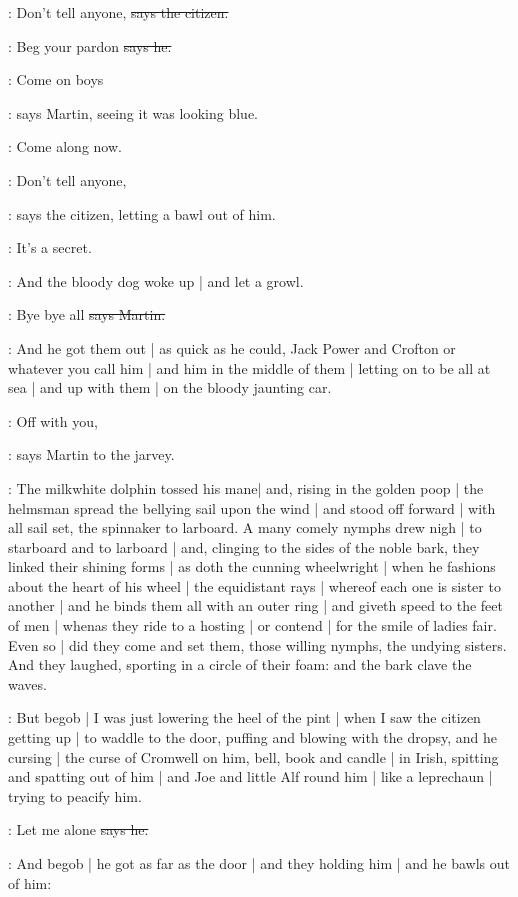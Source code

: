 \citizen:
Don't tell anyone,
\sout{says the citizen.}

\Bloom:
Beg your pardon
\sout{says he.}

\cunningham:
Come on boys

\Nq:
says Martin,
seeing it was looking blue.

\cunningham:
Come along now.

\citizen:
Don't tell anyone,

\Nq:
says the citizen,
letting a bawl out of him.

\citizen:
It's a secret.

\Nq:
And the bloody dog woke up |
and let a growl.

\cunningham:
Bye bye all
\sout{says Martin.}

\Nq:
And he got them out |
as quick as he could,
Jack Power and Crofton or whatever you call him |
and him in the middle of them |
letting on to be all at sea |
and up with them |
on the bloody jaunting car.

\cunningham:
Off with you,

\Nq:
says Martin to the jarvey.

:
The milkwhite dolphin tossed his mane|
and,
rising in the golden poop |
the helmsman spread the bellying sail upon the wind |
and stood off forward |
with all sail set,
the spinnaker to larboard.
A many comely nymphs drew nigh |
to starboard and to larboard |
and,
clinging to the sides of the noble bark,
they linked their shining forms |
as doth the cunning wheelwright |
when he fashions about the heart of his wheel |
the equidistant rays |
whereof each one is sister to another |
and he binds them all with an outer ring |
and giveth speed to the feet of men |
whenas they ride to a hosting |
or contend |
for the smile of ladies fair.
Even so |
did they come and set them,
those willing nymphs,
the undying sisters.
And they laughed,
sporting in a circle of their foam:
and the bark clave the waves.

\Nq:
But begob |
I was just lowering the heel of the pint |
when I saw the citizen getting up |
to waddle to the door,
puffing and blowing with the dropsy,
and he cursing |
the curse of Cromwell on him,
bell, book and candle |
in Irish,
spitting and spatting out of him |
and Joe and little Alf round him |
like a leprechaun |
trying to peacify him.

\citizen:
Let me alone
\sout{says he.}

\Nq:
And begob |
he got as far as the door |
and they holding him |
and he bawls out of him:%

